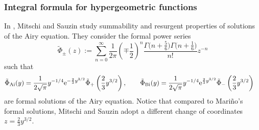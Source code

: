 \documentclass[pdftex]{sigma}
\newcommand{\series}[1]{\tilde{#1}}
\numberwithin{equation}{section}
\begin{document}
\subsubsection{Integral formula for hypergeometric functions}
%
In \cite{diverg-resurg-i}, Mitschi and Sauzin study summability and resurgent properties of solutions of the Airy equation. They consider the formal power series
\[\series{\Phi}_{\pm}(z):= \sum_{n=0}^{\infty}\frac{1}{2\pi}\left(\mp\frac{1}{2}\right)^{n}\frac{\Gamma\bigl(n+\frac{5}{6}\bigr)\Gamma\bigl(n+\frac{1}{6}\bigr)}{n!}z^{-n}\]
such that
\begin{align*}
\series{\Phi}_{\mathrm{Ai}}(y)&=\frac{1}{2\sqrt{\pi}}y^{-1/4}{\rm e}^{-\frac{2}{3}y^{3/2}}\series{\Phi}_{+}\left(\frac{2}{3}y^{3/2}\right),\qquad
\series{\Phi}_{\mathrm{Bi}}(y)=\frac{1}{2\sqrt{\pi}}y^{-1/4}{\rm e}^{\frac{2}{3}y^{3/2}}\series{\Phi}_{-}\left(\frac{2}{3}y^{3/2}\right)
\end{align*}
are formal solutions of the Airy equation. Notice that compared to Mari\~{n}o's formal solutions, Mitschi and Sauzin adopt a different change of coordinates $z=\frac{2}{3}y^{3/2}$.
\end{document}
